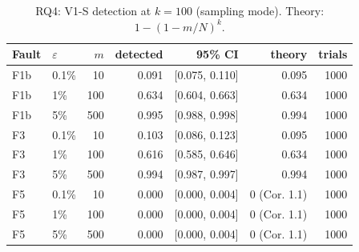 \begin{table}[t]
  \centering
  \caption{RQ4: V1-S detection at $k=100$ (sampling mode). Theory: $1-(1-m/N)^k$.}
  \label{tab:rq4}
  \begin{tabular}{llrrrrr}
    \toprule
    Fault & $\varepsilon$ & $m$ & detected & 95\% CI & theory & trials \\
    \midrule
    F1b & 0.1\% & 10 & 0.091 & [0.075, 0.110] & 0.095 & 1000 \\
    F1b & 1\% & 100 & 0.634 & [0.604, 0.663] & 0.634 & 1000 \\
    F1b & 5\% & 500 & 0.995 & [0.988, 0.998] & 0.994 & 1000 \\
    F3 & 0.1\% & 10 & 0.103 & [0.086, 0.123] & 0.095 & 1000 \\
    F3 & 1\% & 100 & 0.616 & [0.585, 0.646] & 0.634 & 1000 \\
    F3 & 5\% & 500 & 0.994 & [0.987, 0.997] & 0.994 & 1000 \\
    F5 & 0.1\% & 10 & 0.000 & [0.000, 0.004] & 0 (Cor. 1.1) & 1000 \\
    F5 & 1\% & 100 & 0.000 & [0.000, 0.004] & 0 (Cor. 1.1) & 1000 \\
    F5 & 5\% & 500 & 0.000 & [0.000, 0.004] & 0 (Cor. 1.1) & 1000 \\
    \bottomrule
  \end{tabular}
\end{table}
